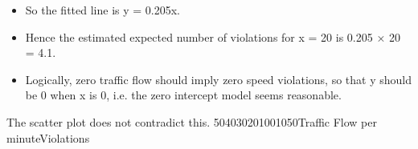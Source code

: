 \documentclass[a4paper,12pt]{article}
\begin{document}
\begin{enumerate}[(a)]
\begin{itemize}
\item So the fitted line is y
= 0.205x.
\item Hence the estimated expected number of violations for x = 20 is 0.205 × 20 = 4.1.
\item Logically, zero traffic flow should imply zero speed violations, so that y should be 0 when x is 0, i.e. the zero intercept model seems reasonable.
\end{itemize} The scatter plot does not contradict this.
504030201001050Traffic Flow per minuteViolations

\end{enumerate}
\end{document}
